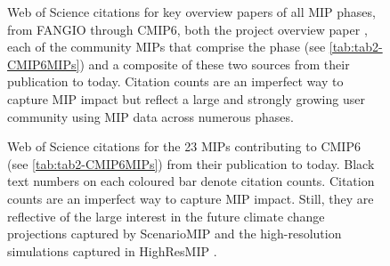 \documentclass[gmd, preprint]{copernicus}
\begin{document}
\begin{figure}
    \centering
    
    \caption{Web of Science citations for key overview papers of all MIP phases, from FANGIO \citep{cess_intercomparison_1990} through CMIP6, both the project overview paper \citep{eyring_overview_2016}, each of the community MIPs that comprise the phase (see \autoref{tab:tab2-CMIP6MIPs}) and a composite of these two sources from their publication to today. Citation counts are an imperfect way to capture MIP impact but reflect a large and strongly growing user community using MIP data across numerous phases.}
    \label{fig:fig3-MIPPhaseCitations}
\end{figure}

\begin{figure}
    \centering
    
    \caption{Web of Science citations for the 23 MIPs contributing to CMIP6 (see \autoref{tab:tab2-CMIP6MIPs}) from their publication to today. Black text numbers on each coloured bar denote citation counts. Citation counts are an imperfect way to capture MIP impact. Still, they are reflective of the large interest in the future climate change projections captured by ScenarioMIP \citep{oneill_scenario_2016} and the high-resolution simulations captured in HighResMIP \citep{haarsma_high_2016}.}
    \label{fig:fig4-MIPCitations}
\end{figure}
\end{document}

